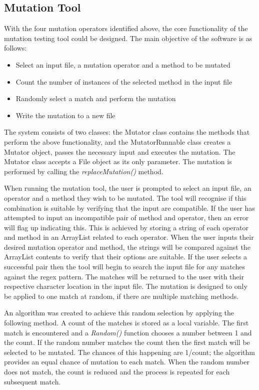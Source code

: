 \documentclass[a4paper,12pt]{article}
\begin{document}
	
\subsection{Mutation Tool}

With the four mutation operators identified above, the core functionality of the mutation testing tool could be designed. The main objective of the software is as follows: 

\begin{itemize}
    \item Select an input file, a mutation operator and a method to be mutated
    \item Count the number of instances of the selected method in the input file
    \item Randomly select a match and perform the mutation
    \item Write the mutation to a new file
\end{itemize}

The system consists of two classes: the Mutator class contains the methods that perform the above functionality, and the MutatorRunnable class creates a Mutator object, passes the necessary input and executes the mutation. The Mutator class accepts a File object as its only parameter. The mutation is performed by calling the \textit{replaceMutation()} method.  

When running the mutation tool, the user is prompted to select an input file, an operator and a method they wish to be mutated. The tool will recognise if this combination is suitable by verifying that the input are compatible. If the user has attempted to input an incompatible pair of method and operator, then an error will flag up indicating this. This is achieved by storing a string of each operator and method in an ArrayList related to each operator. When the user inputs their desired mutation operator and method, the strings will be compared against the ArrayList contents to verify that their options are suitable. If the user selects a successful pair then the tool will begin to search the input file for any matches against the regex pattern. The matches will be returned to the user with their respective character location in the input file. The mutation is designed to only be applied to one match at random, if there are multiple matching methods. 

An algorithm was created to achieve this random selection by applying the following method. A count of the matches is stored as a local variable. The first match is encountered and a \textit{Random()} function chooses a number between 1 and the count. If the random number matches the count then the first match will be selected to be mutated. The chances of this happening are 1/count; the algorithm provides an equal chance of mutation to each match. When the random number does not match, the count is reduced and the process is repeated for each subsequent match.
\end{document}
